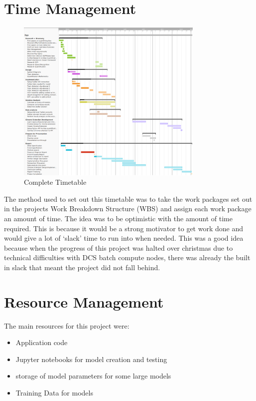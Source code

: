 \section{Time Management}
\begin{figure}[hbtp]
    \centering
    \includegraphics[width=0.8\textwidth]{../images/3yp timeline v3.png}
    \caption{Complete Timetable}
    \label{fig:complete-timetable}
\end{figure}

The method used to set out this timetable was to take the work packages set out in the projects Work Breakdown Structure (WBS)
and assign each work package an amount of time. The idea was to be optimistic with the amount of time required. This is because
it would be a strong motivator to get work done and would give a lot of `slack' time to run into when needed. This was a good
idea because when the progress of this project was halted over christmas due to technical difficulties with DCS batch compute nodes,
there was already the built in slack that meant the project did not fall behind.

\section{Resource Management}
The main resources for this project were:
\begin{itemize}
    \item Application code
    \item Jupyter notebooks for model creation and testing
    \item storage of model parameters for some large models
    \item Training Data for models
\end{itemize}

